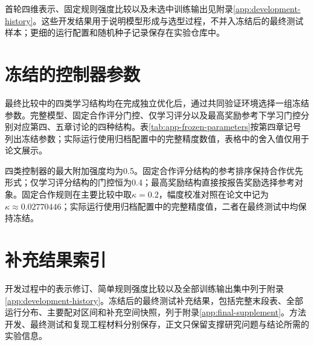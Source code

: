 首轮四维表示、固定规则强度比较以及未选中训练输出见附录\ref{app:development-history}。这些开发结果用于说明模型形成与选型过程，不并入冻结后的最终测试样本；更细的运行配置和随机种子记录保存在实验仓库中。

\section{冻结的控制器参数}

最终比较中的四类学习结构均在完成独立优化后，通过共同验证环境选择一组冻结参数。完整模型、固定合作评分门控、仅学习评分以及最高奖励参考下学习门控分别对应第四、五章讨论的四种结构。表\ref{tab:app-frozen-parameters}按第四章记号列出冻结参数；实际运行使用归档配置中的完整精度数值，表格中的舍入值仅用于论文展示。



四类控制器的最大附加强度均为0.5。固定合作评分结构的参考排序保持合作优先形式；仅学习评分结构的门控恒为0.4；最高奖励结构直接按报告奖励选择参考对象。固定合作规则在主要比较中取$\kappa=0.2$，幅度校准对照在论文中记为$\kappa\approx0.02770446$；实际运行使用归档配置中的完整精度值，二者在最终测试中均保持冻结。

\section{补充结果索引}

开发过程中的表示修订、简单规则强度比较以及全部训练输出集中列于附录\ref{app:development-history}。冻结后的最终测试补充结果，包括完整末段表、全部运行分布、主要配对区间和补充空间快照，列于附录\ref{app:final-supplement}。方法开发、最终测试和复现工程材料分别保存，正文只保留支撑研究问题与结论所需的实验信息。